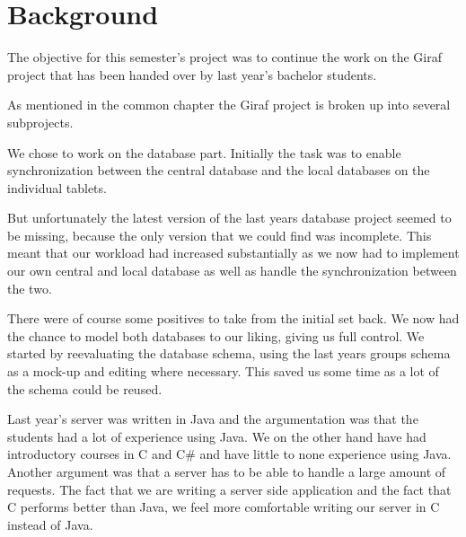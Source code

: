 \section{Background}
The objective for this semester's project was to continue the work on the Giraf project that has been handed over by last year's bachelor students. 

As mentioned in the common chapter the Giraf project is broken up into several subprojects. 

We chose to work on the database part. Initially the task was to enable synchronization between the central database and the local databases on the individual tablets.

But unfortunately the latest version of the last years database project seemed to be missing, because the only version that we could find was incomplete. This meant that our workload had increased substantially as we now had to implement our own central and local database as well as handle the synchronization between the two.

There were of course some positives to take from the initial set back. We now had the chance to model both databases to our liking, giving us full control. We started by reevaluating the database schema, using the last years groups schema as a mock-up and editing where necessary. This saved us some time as a lot of the schema could be reused.

Last year's server was written in Java and the argumentation was that the students had a lot of experience using Java.
We on the other hand have had introductory courses in C and C\# and have little to none experience using Java. Another argument was that a server has to be able to handle a large amount of requests. The fact that we are writing a server side application and the fact that C performs better than Java, we feel more comfortable writing our server in C instead of Java.
